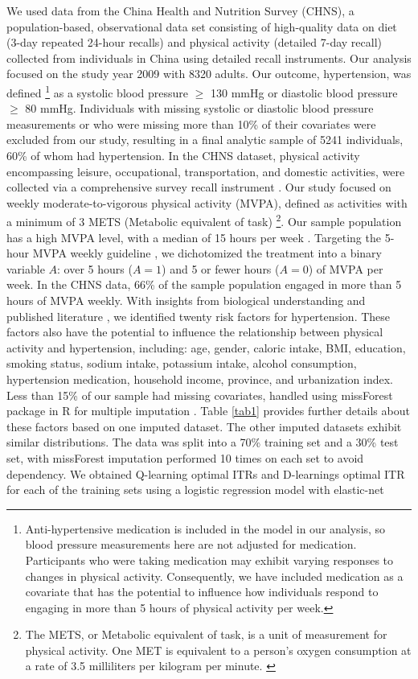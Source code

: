 \documentclass{article}
\begin{document}
We used data from the China Health and Nutrition Survey (CHNS)\cite{zhang2014c}, a population-based, observational data set consisting of high-quality data on diet (3-day repeated 24-hour recalls) and physical activity (detailed 7-day recall)  collected from individuals in China using detailed recall instruments. Our analysis focused on the study year 2009 with 8320 adults. Our outcome, hypertension, was defined \footnote{Anti-hypertensive medication is included in the model in our analysis, so blood pressure measurements here are not adjusted for medication. Participants who were taking medication may exhibit varying responses to changes in physical activity.  Consequently, we have included medication as a covariate that has the potential to influence how individuals respond to engaging in more than 5 hours of physical activity per week.} as a systolic blood pressure $\geq$ 130 mmHg or diastolic blood pressure $\geq$ 80 mmHg. Individuals with missing systolic or diastolic blood pressure measurements or who were missing more than 10\% of their covariates were excluded from our study, resulting in a final analytic sample of 5241 individuals, 60\% of whom had hypertension. In the CHNS dataset, physical activity encompassing leisure, occupational, transportation, and domestic activities, were collected via a comprehensive survey recall instrument \cite{ng2014physical}. Our study focused on weekly moderate-to-vigorous physical activity (MVPA), defined as activities with a minimum of 3 METS (Metabolic equivalent of task) \cite{ainsworth2011} \footnote{The METS, or Metabolic equivalent of task, is a unit of measurement for physical activity. One MET is equivalent to a person's oxygen consumption at a rate of 3.5 milliliters per kilogram per minute. \cite{sylvia2014practical}}. Our sample population has a high MVPA level, with a median of 15 hours per week \citep{ng2014physical}. Targeting the 5-hour MVPA weekly guideline \citep{PAguideline, piercy2018physical,ng2014physical}, we dichotomized the treatment into a binary variable $A$: over 5 hours ($A=1$) and 5 or fewer hours ($A=0$) of MVPA per week. In the CHNS data, 66\% of the sample population engaged in more than 5 hours of MVPA weekly. With insights from biological understanding and published literature \cite{ng2014physical}, we identified twenty risk factors for hypertension. These factors also have the potential to influence the relationship between physical activity and hypertension, including: age, gender, caloric intake, BMI, education, smoking status, sodium intake, potassium intake, alcohol consumption, hypertension medication, household income, province, and urbanization index. Less than 15\% of our sample had missing covariates, handled using missForest package in R for multiple imputation \citep{missForestManual, missForestPaper}. Table \ref{tab1} provides further details about these factors based on one imputed dataset. The other imputed datasets exhibit similar distributions. The data was split into a 70\% training set and a 30\% test set, with missForest imputation performed 10 times on each set to avoid dependency. We obtained Q-learning optimal ITRs \citep{qian2011performance} and D-learnings optimal ITR \citep{tian2014simple} for each of the training sets using a logistic regression model with elastic-net 
\end{document}
